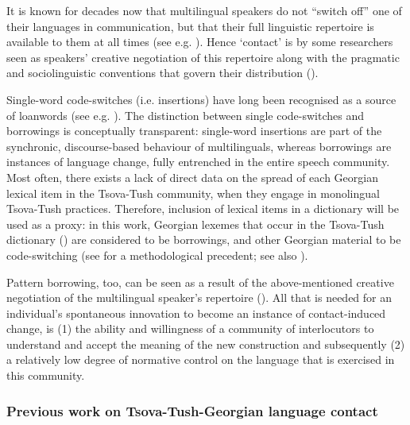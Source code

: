 It is known for decades now that multilingual speakers do not ``switch off'' one of their languages in communication, but that their full linguistic repertoire is available to them at all times (see e.g. \cite{bialystok2012bilingualbrain}). Hence `contact' is by some researchers seen as speakers' creative negotiation of this repertoire along with the pragmatic and sociolinguistic conventions that govern their distribution (\cite{matras2012activity}).

Single-word code-switches (i.e. insertions) have long been recognised as a source of loanwords (see e.g. \cite{gardnerchloros19887cs}). The distinction between single code-switches and borrowings is 
conceptually transparent: single-word insertions are part of the synchronic, discourse-based behaviour of multilinguals, whereas borrowings are instances of language change, fully entrenched in the entire speech community. Most often, there exists a lack of direct data on the spread of each Georgian lexical item in the Tsova-Tush community, when they engage in monolingual Tsova-Tush practices. Therefore, inclusion of lexical items in a dictionary will be used as a proxy: in this work, Georgian lexemes that occur in the Tsova-Tush dictionary (\cite{kadkad84}) are considered to be borrowings, and other Georgian
material to be code-switching (see \cite{deucharetal2018welshbilingual} for a methodological precedent; see also
\cite{forker19}).

Pattern borrowing, too, can be seen as a result of the above-mentioned creative negotiation of the multilingual speaker's repertoire (\cite{matras2012activity}). All that is needed for an individual's spontaneous innovation to become an instance of contact-induced change, is (1) the ability and willingness of a community of interlocutors to understand and accept the meaning of the new construction and subsequently (2) a relatively low degree of normative control on the language that is exercised in this community.


\subsubsection{Previous work on Tsova-Tush-Georgian language contact} \label{previouscontact}

